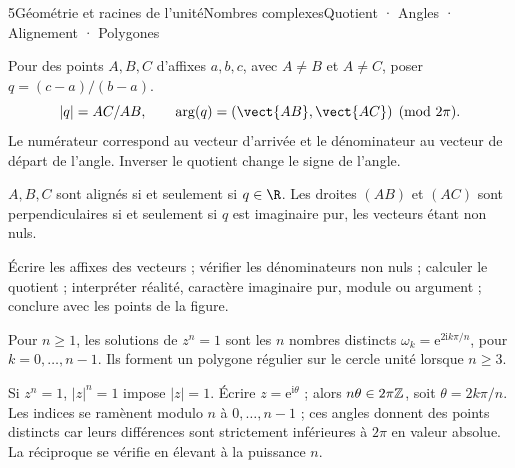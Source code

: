 \begin{ouverture}[trigo]{5}{Géométrie et racines de l’unité}{Nombres complexes}{Quotient · Angles · Alignement · Polygones}
\end{ouverture}
\essentiel

Pour des points $A,B,C$ d'affixes $a,b,c$, avec $A\ne B$ et $A\ne C$, poser $q=(c-a)/(b-a)$.
\[|q|=AC/AB,\qquad \arg(q)=(\vect{AB},\vect{AC})\pmod{2\pi}.\]
Le numérateur correspond au vecteur d'arrivée et le dénominateur au vecteur de départ de l'angle. Inverser le quotient change le signe de l'angle.
\begin{propriete}
$A,B,C$ sont alignés si et seulement si $q\in\R$.
Les droites $(AB)$ et $(AC)$ sont perpendiculaires si et seulement si $q$ est imaginaire pur, les vecteurs étant non nuls.
\end{propriete}
\begin{savoirfaire}
Écrire les affixes des vecteurs ; vérifier les dénominateurs non nuls ; calculer le quotient ; interpréter réalité, caractère imaginaire pur, module ou argument ; conclure avec les points de la figure.
\end{savoirfaire}
\begin{theoreme}
Pour $n\geq1$, les solutions de $z^n=1$ sont les $n$ nombres distincts
$\omega_k=\mathrm e^{2\mathrm ik\pi/n}$, pour $k=0,\ldots,n-1$.
Ils forment un polygone régulier sur le cercle unité lorsque $n\geq3$.
\end{theoreme}
\begin{demonstration}
Si $z^n=1$, $|z|^n=1$ impose $|z|=1$. Écrire $z=\mathrm e^{\mathrm i\theta}$ ; alors $n\theta\in2\pi\mathbb{Z}$, soit $\theta=2k\pi/n$.
Les indices se ramènent modulo $n$ à $0,\ldots,n-1$ ; ces angles donnent des points distincts car leurs différences sont strictement inférieures à $2\pi$ en valeur absolue. La réciproque se vérifie en élevant à la puissance $n$.
\end{demonstration}
